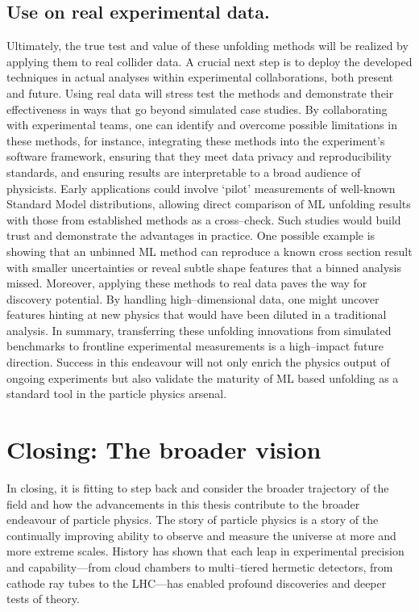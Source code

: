             \subsection{Use on real experimental data.}
                Ultimately, the true test and value of these unfolding methods will be realized by applying them to real collider data.
                A crucial next step is to deploy the developed techniques in actual analyses within experimental collaborations, both present and future.
                Using real data will stress test the methods and demonstrate their effectiveness in ways that go beyond simulated case studies.
                By collaborating with experimental teams, one can identify and overcome possible limitations in these methods, for instance, integrating these methods into the experiment's software framework, ensuring that they meet data privacy and reproducibility standards, and ensuring results are interpretable to a broad audience of physicists.
                Early applications could involve `pilot' measurements of well-known Standard Model distributions, allowing direct comparison of ML unfolding results with those from established methods as a cross--check.
                Such studies would build trust and demonstrate the advantages in practice.
                One possible example is showing that an unbinned ML method can reproduce a known cross section result with smaller uncertainties or reveal subtle shape features that a binned analysis missed.
                Moreover, applying these methods to real data paves the way for discovery potential.
                By handling high--dimensional data, one might uncover features hinting at new physics that would have been diluted in a traditional analysis.
                In summary, transferring these unfolding innovations from simulated benchmarks to frontline experimental measurements is a high--impact future direction.
                Success in this endeavour will not only enrich the physics output of ongoing experiments but also validate the maturity of ML based unfolding as a standard tool in the particle physics arsenal.
\section{Closing: The broader vision}
    In closing, it is fitting to step back and consider the broader trajectory of the field and how the advancements in this thesis contribute to the broader endeavour of particle physics.
    The story of particle physics is a story of the continually improving ability to observe and measure the universe at more and more extreme scales.
    History has shown that each leap in experimental precision and capability---from cloud chambers to multi--tiered hermetic detectors, from cathode ray tubes to the LHC---has enabled profound discoveries and deeper tests of theory.
    
